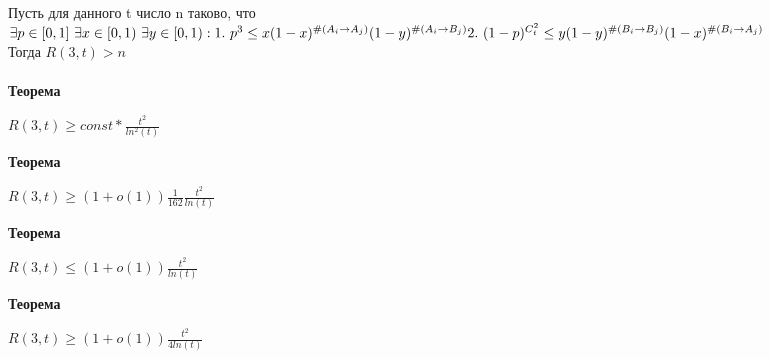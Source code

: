 Пусть для данного t число n таково, что \\ $\exists p \in [0,1]\ \exists x \in[0,1) \ \exists y \in[0,1): \\ \\ 1.\ p^3 \leq x(1-x)^{\#(A_i \rightarrow A_j)}(1-y)^{\#(A_i \rightarrow B_j)}
\\
2.\ (1-p)^{C_t^2} \leq y(1-y)^{\#(B_i \rightarrow B_j)}(1-x)^{\#(B_i \rightarrow A_j)}$ \\
Тогда $R(3,t) > n$
\EndProof
\\
\\
\textbf{Теорема}
\begin{center}
    $R(3,t) \geq const*\frac{t^2}{ln^2(t)}$
\end{center}
\textbf{Теорема}
\begin{center}
    $R(3,t) \geq (1 + o(1))\frac{1}{162}\frac{t^2}{ln(t)}$
\end{center}
\textbf{Теорема}
\begin{center}
    $R(3,t) \leq (1 + o(1))\frac{t^2}{ln(t)}$
\end{center}
\textbf{Теорема}
\begin{center}
    $R(3,t) \geq (1 + o(1))\frac{t^2}{4ln(t)}$
\end{center}


